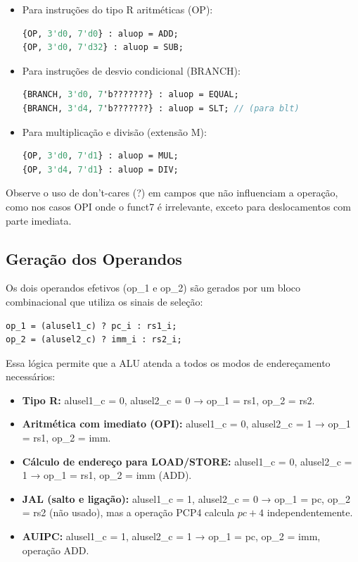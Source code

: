 \documentclass[
	12pt,				%
	oneside,
	a4paper,			%
	english,			%
	french,				%
	spanish,			%
	brazil,				%
	]{abntex2}
\begin{document}
\begin{itemize}
    \item Para instruções do tipo R aritméticas (OP):
    \begin{lstlisting}[language=SystemVerilog]
{OP, 3'd0, 7'd0} : aluop = ADD;
{OP, 3'd0, 7'd32} : aluop = SUB;
    \end{lstlisting}
    \item Para instruções de desvio condicional (BRANCH):
    \begin{lstlisting}[language=SystemVerilog]
{BRANCH, 3'd0, 7'b???????} : aluop = EQUAL;
{BRANCH, 3'd4, 7'b???????} : aluop = SLT; // (para blt)
    \end{lstlisting}
    \item Para multiplicação e divisão (extensão M):
    \begin{lstlisting}[language=SystemVerilog]
{OP, 3'd0, 7'd1} : aluop = MUL;
{OP, 3'd4, 7'd1} : aluop = DIV;
    \end{lstlisting}

\end{itemize}

Observe o uso de don’t-cares (?) em campos que não influenciam a operação, como nos casos OPI onde o funct7 é irrelevante, exceto para deslocamentos com parte imediata.

\subsection{Geração dos Operandos}
Os dois operandos efetivos (op\_1 e op\_2) são gerados por um bloco combinacional que utiliza os sinais de seleção:

\begin{lstlisting}[language=SystemVerilog]
op_1 = (alusel1_c) ? pc_i : rs1_i;
op_2 = (alusel2_c) ? imm_i : rs2_i;
    \end{lstlisting}

Essa lógica permite que a ALU atenda a todos os modos de endereçamento necessários:
\begin{itemize}
    \item \textbf{Tipo R:} alusel1\_c = 0, alusel2\_c = 0 → op\_1 = rs1, op\_2 = rs2.
    \item \textbf{Aritmética com imediato (OPI):} alusel1\_c = 0, alusel2\_c = 1 → op\_1 = rs1, op\_2 = imm.
    \item \textbf{Cálculo de endereço para LOAD/STORE:} alusel1\_c = 0, alusel2\_c = 1 → op\_1 = rs1, op\_2 = imm (ADD).
    \item \textbf{JAL (salto e ligação):} alusel1\_c = 1, alusel2\_c = 0 → op\_1 = pc, op\_2 = rs2 (não usado), mas a operação PCP4 calcula $pc + 4$ independentemente.
    \item \textbf{AUIPC:} alusel1\_c = 1, alusel2\_c = 1 → op\_1 = pc, op\_2 = imm, operação ADD.
\end{itemize}
\end{document}
